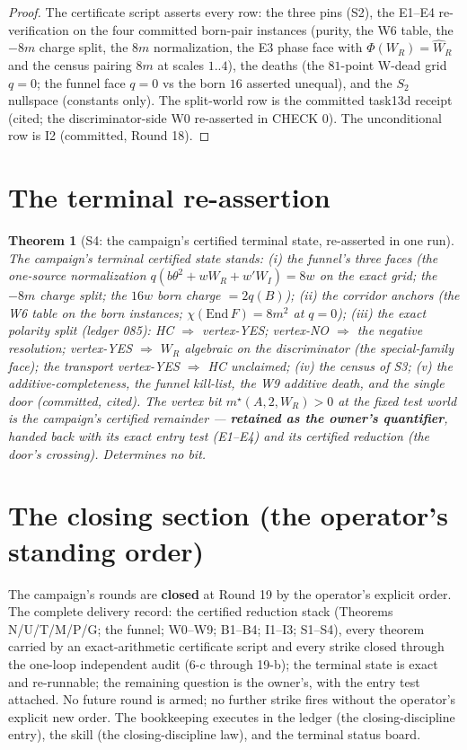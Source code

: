 \documentclass[11pt]{article}
\newtheorem{theorem}{Theorem}
\begin{document}
\begin{proof}
The certificate script asserts every row: the three pins (S2), the E1--E4
re-verification on the four committed born-pair instances (purity, the W6
table, the $-8m$ charge split, the $8m$ normalization, the E3 phase face with
$\Phi(W_R)=\hat W_R$ and the census pairing $8m$ at scales $1..4$), the deaths
(the $81$-point W-dead grid $q=0$; the funnel face $q=0$ vs the born $16$
asserted unequal), and the $S_2$ nullspace (constants only). The split-world
row is the committed task13d receipt (cited; the discriminator-side W0
re-asserted in CHECK 0). The unconditional row is I2 (committed, Round 18).
\end{proof}

\section{The terminal re-assertion}

\begin{theorem}[S4: the campaign's certified terminal state, re-asserted in one run]
\label{thm:s4}
The campaign's terminal certified state stands: (i) the funnel's three faces
(the one-source normalization $q(b\theta^2+wW_R+w'W_I)=8w$ on the exact grid;
the $-8m$ charge split; the $16w$ born charge $=2q(B)$); (ii) the corridor
anchors (the W6 table on the born instances; $\chi(\mathrm{End}\,F)=8m^2$ at
$q=0$); (iii) the exact polarity split (ledger 085): HC $\Rightarrow$
vertex-YES; vertex-NO $\Rightarrow$ the negative resolution; vertex-YES
$\Rightarrow$ $W_R$ algebraic \emph{on the discriminator} (the special-family
face); the transport vertex-YES $\Rightarrow$ HC \emph{unclaimed}; (iv) the
census of S3; (v) the additive-completeness, the funnel kill-list, the W9
additive death, and the single door (committed, cited). The vertex bit
$m^\star(A,2,W_R)>0$ at the fixed test world is the campaign's certified
remainder --- \textbf{retained as the owner's quantifier}, handed back with
its exact entry test (E1--E4) and its certified reduction (the door's
crossing). \emph{Determines no bit.}
\end{theorem}

\section{The closing section (the operator's standing order)}

The campaign's rounds are \textbf{closed} at Round 19 by the operator's
explicit order. The complete delivery record: the certified reduction stack
(Theorems N/U/T/M/P/G; the funnel; W0--W9; B1--B4; I1--I3; S1--S4), every
theorem carried by an exact-arithmetic certificate script and every strike
closed through the one-loop independent audit (6-c through 19-b); the
terminal state is exact and re-runnable; the remaining question is the
owner's, with the entry test attached. No future round is armed; no further
strike fires without the operator's explicit new order. The bookkeeping
 executes in the ledger (the closing-discipline entry), the skill (the
closing-discipline law), and the terminal status board.
\end{document}
